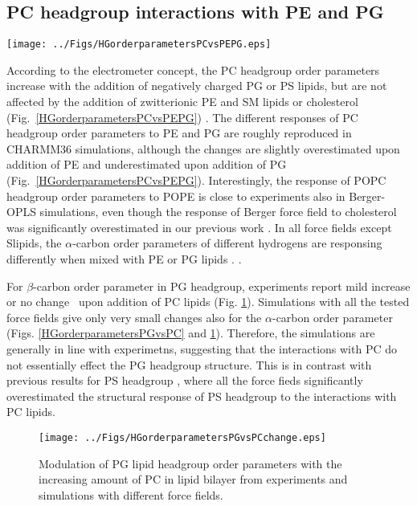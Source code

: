 \documentclass[aps,prl,superscriptaddress,twocolumn]{revtex4}
\begin{document}
\subsection{PC headgroup interactions with PE and PG}
\begin{figure*}[]
  \centering
  \texttt{[image: ../Figs/HGorderparametersPCvsPEPG.eps]}
  \caption{\label{HGorderparametersPCvsPEPG}
    Modulation of POPC headgroup order parameters with increasing amount of POPE (left) and POPG (right) in bilayer
    from experiments \cite{scherer87,macdonald87} and simulations with different force fields.
    Signs are determined as discussed in \cite{botan15,ollila16}.
  }
\end{figure*}
According to the electrometer concept, the PC headgroup order parameters increase
with the addition of negatively charged PG or PS lipids, but
are not affected by the addition of zwitterionic PE and SM lipids
or cholesterol (Fig.~\ref{HGorderparametersPCvsPEPG}) \cite{seelig87, scherer87,antila18}. 
The different responses of PC headgroup order parameters to PE and PG are roughly
reproduced in CHARMM36 simulations, although the changes are slightly
overestimated upon addition of PE and underestimated upon addition of PG (Fig.~\ref{HGorderparametersPCvsPEPG}).
Interestingly, the response of POPC headgroup order parameters to POPE is
close to experiments also in Berger-OPLS simulations, even though the response
of Berger force field to cholesterol was significantly overestimated in our previous work \cite{botan15}.
In all force fields except Slipids, the $\alpha$-carbon order parameters of different
hydrogens are responsing differently when mixed with PE or PG lipids .
.

For $\beta$-carbon order parameter in PG headgroup, experiments report
mild increase \cite{macdonald87} or no change~\cite{borle85} upon addition 
of PC lipids (Fig. \ref{HGorderparametersPGvsPCchange}). 
Simulations with all the tested force fields give only very small changes also for
the $\alpha$-carbon order parameter (Figs. \ref{HGorderparametersPGvsPC} and \ref{HGorderparametersPGvsPCchange}). 
Therefore, the simulations are generally in line with experimetns, suggesting that the
interactions with PC do not essentially effect the PG headgroup structure.
This is in contrast with previous results for PS headgroup \cite{antila18}, where
all the force fieds significantly overestimated the structural response of PS headgroup
to the interactions with PC lipids.
\begin{figure}[]
  \centering
  \texttt{[image: ../Figs/HGorderparametersPGvsPCchange.eps]}
  \caption{\label{HGorderparametersPGvsPCchange}
    Modulation of PG lipid headgroup order parameters with the increasing amount of PC in lipid bilayer
    from experiments \cite{borle85,macdonald87} and simulations with different force fields.
  }
\end{figure}
\end{document}
